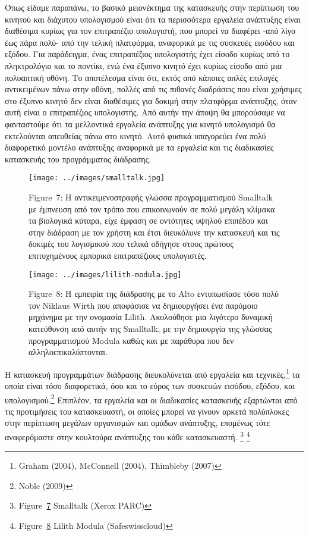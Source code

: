 \documentclass[
]{article}
\begin{document}
Όπως είδαμε παραπάνω, το βασικό μειονέκτημα της κατασκευής στην
περίπτωση του κινητού και διάχυτου υπολογισμού είναι ότι τα περισσότερα
εργαλεία ανάπτυξης είναι διαθέσιμα κυρίως για τον επιτραπέζιο
υπολογιστή, που μπορεί να διαφέρει -από λίγο έως πάρα πολύ- από την
τελική πλατφόρμα, αναφορικά με τις συσκευές εισόδου και εξόδου. Για
παράδειγμα, ένας επιτραπέζιος υπολογιστής έχει είσοδο κυρίως από το
πληκτρολόγιο και το ποντίκι, ενώ ένα έξυπνο κινητό έχει κυρίως είσοδο
από μια πολυαπτική οθόνη. Το αποτέλεσμα είναι ότι, εκτός από κάποιες
απλές επιλογές αντικειμένων πάνω στην οθόνη, πολλές από τις πιθανές
διαδράσεις που είναι χρήσιμες στο έξυπνο κινητό δεν είναι διαθέσιμες για
δοκιμή στην πλατφόρμα ανάπτυξης, όταν αυτή είναι ο επιτραπέζιος
υπολογιστής. Από αυτήν την άποψη θα μπορούσαμε να φανταστούμε ότι τα
μελλοντικά εργαλεία ανάπτυξης για κινητό υπολογισμό θα εκτελούνται
απευθείας πάνω στο κινητό. Αυτό φυσικά υπαγορεύει ένα πολύ διαφορετικό
μοντέλο ανάπτυξης αναφορικά με τα εργαλεία και τις διαδικασίες
κατασκευής του προγράμματος διάδρασης.

\leavevmode{}%
\begin{figure}
\hypertarget{fig:smalltalk}{%
\centering
\texttt{[image: ../images/smalltalk.jpg]}
\caption{Figure~7: Η αντικειμενοστραφής γλώσσα προγραμματισμού Smalltalk
με έμπνευση από τον τρόπο που επικοινωνούν σε πολύ μεγάλη κλίμακα τα
βιολογικά κύταρα, είχε έμφαση σε οντότητες υψηλού επιπέδου και στην
διάδραση με τον χρήστη και έτσι διευκόλυνε την κατασκευή και τις δοκιμές
του λογισμικού που τελικά οδήγησε στους πρώτους επιτυχημένους εμπορικά
επιτραπέζιους υπολογιστές.}\label{fig:smalltalk}
}
\end{figure}

\leavevmode{}%
\begin{figure}
\hypertarget{fig:lilith-modula}{%
\centering
\texttt{[image: ../images/lilith-modula.jpg]}
\caption{Figure~8: Η εμπειρία της διάδρασης με το Alto εντυπωσίασε τόσο
πολύ τον Niklaus Wirth που αποφάσισε να δημιουργήσει ένα παρόμοιο
μηχάνημα με την ονομασία Lilith. Ακολούθησε μια λιγότερο δυναμική
κατεύθυνση από αυτήν της Smalltalk, με την δημιουργία της γλώσσας
προγραμματισμού Modula καθώς και με παράθυρα που δεν
αλληλοεπικαλύπτονται.}\label{fig:lilith-modula}
}
\end{figure}

Η κατασκευή προγραμμάτων διάδρασης διευκολύνεται από εργαλεία και
τεχνικές,\footnote{Graham (2004), McConnell (2004), Thimbleby (2007)} τα
οποία είναι τόσο διαφορετικά, όσο και το εύρος των συσκευών εισόδου,
εξόδου, και υπολογισμού.\footnote{Noble (2009)} Επιπλέον, τα εργαλεία
και οι διαδικασίες κατασκευής εξαρτώνται από τις προτιμήσεις του
κατασκευαστή, οι οποίες μπορεί να γίνουν αρκετά πολύπλοκες στην
περίπτωση μεγάλων οργανισμών και ομάδων ανάπτυξης, επομένως τότε
αναφερόμαστε στην κουλτούρα ανάπτυξης του κάθε κατασκευαστή. \footnote{Figure~\protect\hyperlink{fig:smalltalk}{7}
  Smalltalk (Xerox PARC)} \footnote{Figure~\protect\hyperlink{fig:lilith-modula}{8}
  Lilith Modula (Safeswisscloud)}
\end{document}
